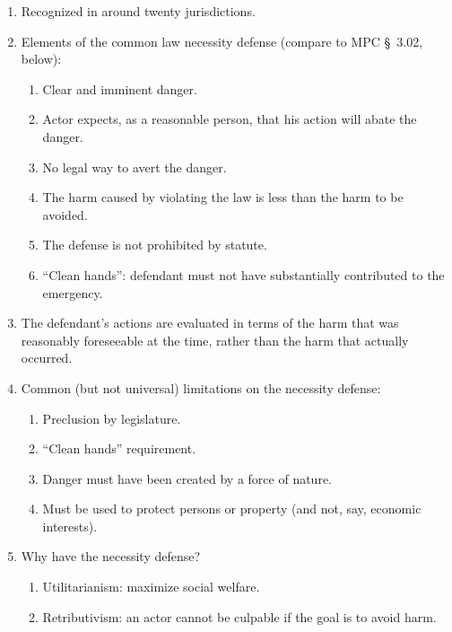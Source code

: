 \begin{enumerate}
    \item Recognized in around twenty jurisdictions.
    \item Elements of the common law necessity defense (compare to MPC \S\ 
    3.02, below):
    \begin{enumerate}
        \item Clear and imminent danger.
        \item Actor expects, as a reasonable person, that his action will 
        abate the danger.
        \item No legal way to avert the danger.
        \item The harm caused by violating the law is less than the harm to be 
        avoided.
        \item The defense is not prohibited by statute.
        \item ``Clean hands'': defendant must not have substantially 
        contributed to the emergency.
    \end{enumerate}
    \item The defendant's actions are evaluated in terms of the harm that was 
    reasonably foreseeable at the time, rather than the harm that actually 
    occurred.
    \item Common (but not universal) limitations on the necessity defense:
    \begin{enumerate}
        \item Preclusion by legislature.
        \item ``Clean hands'' requirement.
        \item Danger must have been created by a force of nature.
        \item Must be used to protect persons or property (and not, say, 
        economic interests).
    \end{enumerate}
    \item Why have the necessity defense?
    \begin{enumerate}
        \item Utilitarianism: maximize social welfare.
        \item Retributivism: an actor cannot be culpable if the goal is to 
        avoid harm.
    \end{enumerate}
\end{enumerate}

